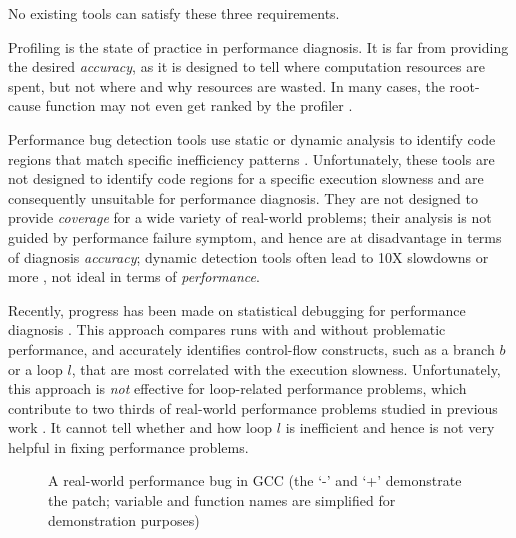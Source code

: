 No existing tools can satisfy these
three requirements.

Profiling is the state of practice in performance diagnosis.
It is far from providing the desired \textit{accuracy}, as it is designed to
tell where computation resources are spent, 
but not where and why resources are wasted. 
In many cases, the root-cause function may not even
get ranked by the profiler \cite{SongOOPSLA2014}.

Performance bug detection tools use static or dynamic analysis to identify
code regions that match specific inefficiency patterns 
\cite{Alabama,CARAMEL, Cachetor,Xu:2010:FLD:1806596.1806617,Dufour:2008:STC:1453101.1453111, Xu:2009:GFP:1542476.1542523, Xu:2010:DIC:1806596.1806616,IsilDillig.PLDI15}. 
Unfortunately, these tools are not designed %
{\color{red} to identify code regions for a specific execution slowness}  
and are consequently
unsuitable for performance diagnosis.
They are not designed to provide \textit{coverage} for a wide
variety of real-world problems; their analysis is not guided by
performance failure symptom, and hence are at disadvantage in terms of diagnosis
\textit{accuracy}; dynamic detection tools often lead to 
10X slowdowns or more \cite{Cachetor,Xu:2010:FLD:1806596.1806617,Alabama}, 
not ideal in terms of \textit{performance}.

Recently, progress has been made on statistical debugging for
performance diagnosis \cite{SongOOPSLA2014}.
This approach compares runs with and without problematic performance, and
accurately identifies control-flow constructs, such as a branch $b$ or 
a loop $l$, that are most correlated with
the execution slowness.%
Unfortunately, this approach is \textit{not} effective
for loop-related 
performance problems, which contribute to two thirds of
real-world performance problems studied in previous work 
\cite{SongOOPSLA2014,PerfBug}. It cannot
tell whether and how loop $l$ is inefficient 
and hence is not very helpful
in fixing performance problems.

\begin{figure}
\centering
{}
  \mbox{}
\caption{A real-world performance bug in GCC (the `-' and `+' demonstrate the patch; variable and 
function names are simplified for demonstration purposes)}
\label{fig:GCC27733}
\end{figure}

